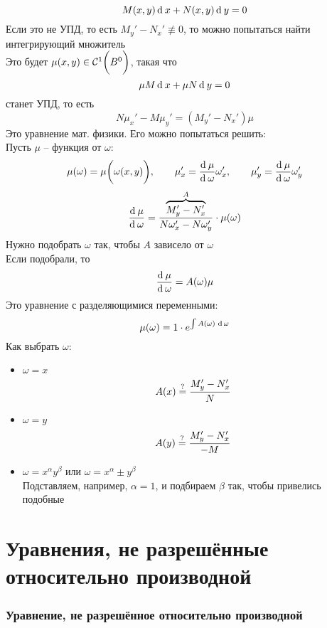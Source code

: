 $$ M(x, y) \di x + N(x, y) \di y = 0 $$
Если это не УПД, то есть $ M_y' - N_x' \not\equiv 0 $, то можно попытаться найти интегрирующий множитель \\
Это будет $ \mu(x ,y) \in \Cont[1]{B^0} $, такая что
$$ \mu M\di x + \mu N \di y = 0 $$
станет УПД, то есть
$$ N\mu_x' - M\mu_y' = (M_y' - N_x')\mu $$
Это уравнение мат. физики. Его можно попытаться решить: \\
Пусть $ \mu $ -- функция от $ \omega $:
$$ \mu(\omega) = \mu \bigg( \omega(x, y) \bigg), \qquad \mu_x' = \frac{\di \mu}{\di \omega}\omega_x', \qquad \mu_y' = \frac{\di \mu}{\di \omega}\omega_y' $$
$$ \frac{\di \mu}{\di \omega} = \frac{\overbrace{M_y' - N_x'}^A}{N\omega_x' - N\omega_y'} \cdot \mu(\omega) $$
Нужно подобрать $ \omega $ так, чтобы $ A $ зависело от $ \omega $ \\
Если подобрали, то
$$ \frac{\di\mu}{\di\omega} = A(\omega)\mu $$
Это уравнение с разделяющимися переменными:
$$ \mu(\omega) = 1 \cdot e^{\uint[\omega]{A(\omega)}} $$
Как выбрать $ \omega $:
\begin{itemize}
	\item $ \omega = x $
    $$ A(x) \iseq \frac{M_y' - N_x'}N $$
    \item $ \omega = y $
    $$ A(y) \iseq \frac{M_y' - N_x'}{-M} $$
    \item $ \omega = x^\alpha y^\beta $ или $ \omega = x^\alpha \pm y^\beta $ \\
    Подставляем, например, $ \alpha = 1 $, и подбираем $ \beta $ так, чтобы привелись подобные
\end{itemize}

\part{Уравнения, не разрешённые относительно \n производной}

\section{Уравнение, не разрешённое относительно производной}

